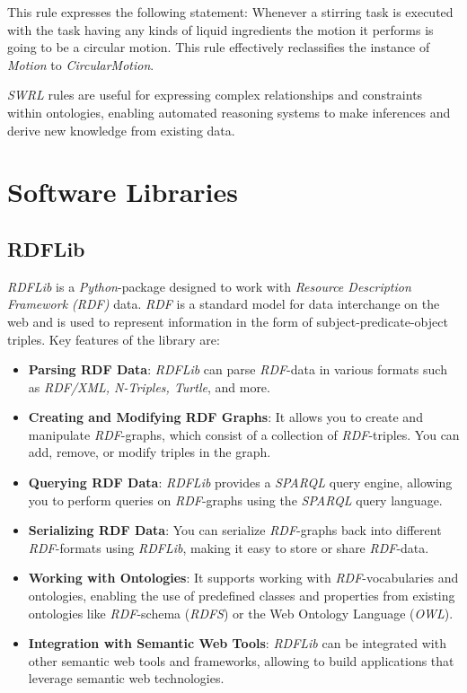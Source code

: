 This rule expresses the following statement:
Whenever a stirring task is executed with the task having any kinds of liquid ingredients the motion it performs is going to be a circular motion.
This rule effectively reclassifies the instance of \textit{Motion} to \textit{CircularMotion}.


\textit{SWRL} \cite{Horrocks2004} rules are useful for expressing complex relationships and constraints within ontologies, enabling automated reasoning systems to make inferences and derive new knowledge from existing data.

\section{Software Libraries}
\label{sec:Libraries}
\subsection{RDFLib}
\label{sec:RDFLib}
\textit{RDFLib} \cite{Krech_RDFLib_2023} is a \textit{Python}-package designed to work with \textit{Resource Description Framework (RDF)} data. \textit{RDF} is a standard model for data interchange on the web and is used to represent information in the form of subject-predicate-object triples. Key features of the library are:

\begin{itemize}
\item \textbf{Parsing RDF Data}: \textit{RDFLib} can parse \textit{RDF}-data in various formats such as \textit{RDF/XML, N-Triples, Turtle}, and more.

\item \textbf{Creating and Modifying RDF Graphs}: It allows you to create and manipulate \textit{RDF}-graphs, which consist of a collection of \textit{RDF}-triples. You can add, remove, or modify triples in the graph.

\item \textbf{Querying RDF Data}: \textit{RDFLib} provides a \textit{SPARQL} query engine, allowing you to perform queries on \textit{RDF}-graphs using the \textit{SPARQL} query language.

\item \textbf{Serializing RDF Data}: You can serialize \textit{RDF}-graphs back into different \textit{RDF}-formats using \textit{RDFLib}, making it easy to store or share \textit{RDF}-data.

\item \textbf{Working with Ontologies}: It supports working with \textit{RDF}-vocabularies and ontologies, enabling the use of predefined classes and properties from existing ontologies like \textit{RDF}-schema (\textit{RDFS}) or the Web Ontology Language (\textit{OWL}).

\item \textbf{Integration with Semantic Web Tools}: \textit{RDFLib} can be integrated with other semantic web tools and frameworks, allowing to build applications that leverage semantic web technologies.
\end{itemize}

